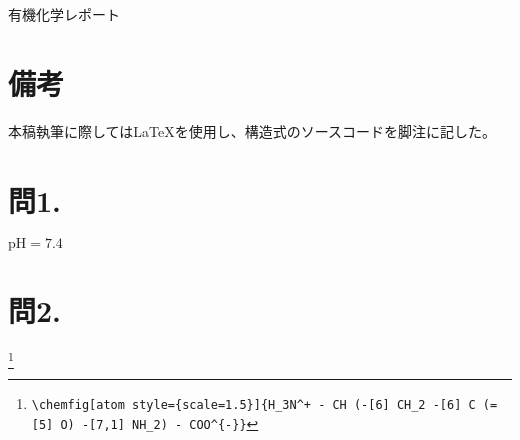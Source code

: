 \documentclass{ltjsarticle}
\begin{document}
\begin{center}
  \LARGE{有機化学レポート}
\end{center}
\section*{備考}
本稿執筆に際しては\LaTeX を使用し、構造式のソースコードを脚注に記した。
\section*{問1.}
$\mathrm{pH}=7.4$
\section*{問2.}
\begin{center}
  \footnote{\verb|\chemfig[atom style={scale=1.5}]{H_3N^+ - CH (-[6] CH_2 -[6] C (=[5] O) -[7,1] NH_2) - COO^{-}}|}
\end{center}
\end{document}
